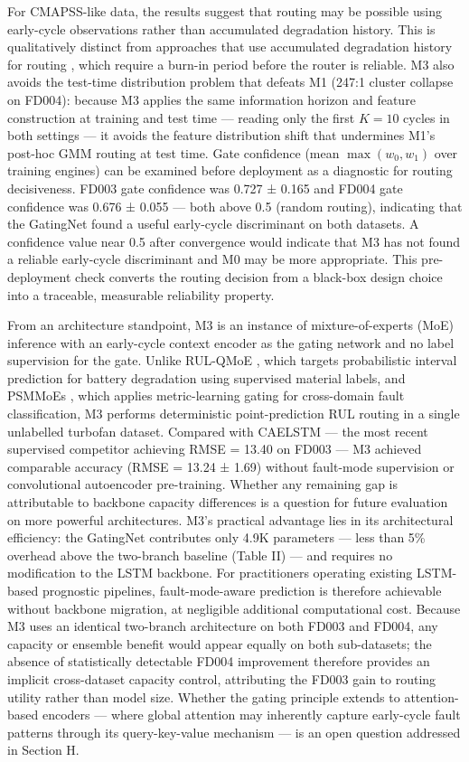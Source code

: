 \documentclass[preprint,10pt]{elsarticle}
\begin{document}
For CMAPSS-like data, the results suggest that routing may be possible using early-cycle observations rather than accumulated degradation history. This is qualitatively distinct from approaches that use accumulated degradation history for routing \cite{ref30,ref31,ref33}, which require a burn-in period before the router is reliable. M3 also avoids the test-time distribution problem that defeats M1 (247:1 cluster collapse on FD004): because M3 applies the same information horizon and feature construction at training and test time --- reading only the first $K = 10$ cycles in both settings --- it avoids the feature distribution shift that undermines M1's post-hoc GMM routing at test time. Gate confidence (mean $\max(w_0, w_1)$ over training engines) can be examined before deployment as a diagnostic for routing decisiveness. FD003 gate confidence was 0.727 ± 0.165 and FD004 gate confidence was 0.676 ± 0.055 --- both above 0.5 (random routing), indicating that the GatingNet found a useful early-cycle discriminant on both datasets. A confidence value near 0.5 after convergence would indicate that M3 has not found a reliable early-cycle discriminant and M0 may be more appropriate. This pre-deployment check converts the routing decision from a black-box design choice into a traceable, measurable reliability property.

From an architecture standpoint, M3 is an instance of mixture-of-experts (MoE) inference \cite{ref32,ref43,ref44} with an early-cycle context encoder as the gating network and no label supervision for the gate. Unlike RUL-QMoE \cite{ref43}, which targets probabilistic interval prediction for battery degradation using supervised material labels, and PSMMoEs \cite{ref44}, which applies metric-learning gating for cross-domain fault classification, M3 performs deterministic point-prediction RUL routing in a single unlabelled turbofan dataset. Compared with CAELSTM \cite{ref15} --- the most recent supervised competitor achieving RMSE = 13.40 on FD003 --- M3 achieved comparable accuracy (RMSE = 13.24 ± 1.69) without fault-mode supervision or convolutional autoencoder pre-training. Whether any remaining gap is attributable to backbone capacity differences is a question for future evaluation on more powerful architectures. M3's practical advantage lies in its architectural efficiency: the GatingNet contributes only 4.9K parameters — less than 5\% overhead above the two-branch baseline (Table II) — and requires no modification to the LSTM backbone. For practitioners operating existing LSTM-based prognostic pipelines, fault-mode-aware prediction is therefore achievable without backbone migration, at negligible additional computational cost. Because M3 uses an identical two-branch architecture on both FD003 and FD004, any capacity or ensemble benefit would appear equally on both sub-datasets; the absence of statistically detectable FD004 improvement therefore provides an implicit cross-dataset capacity control, attributing the FD003 gain to routing utility rather than model size. Whether the gating principle extends to attention-based encoders \cite{ref08,ref13,ref14} — where global attention may inherently capture early-cycle fault patterns through its query-key-value mechanism — is an open question addressed in Section H.
\end{document}
